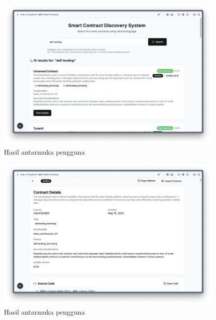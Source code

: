 \begin{figure}[ht]
	\centering
	\includegraphics[width=1\textwidth]{resources/appendix/hasil-gui-2.png}
	\caption{Hasil antarmuka pengguna}
	\label{image:hasil-gui-2}
\end{figure}

\begin{figure}[ht]
	\centering
	\includegraphics[width=1\textwidth]{resources/appendix/hasil-gui-3.png}
	\caption{Hasil antarmuka pengguna}
	\label{image:hasil-gui-3}
\end{figure}


